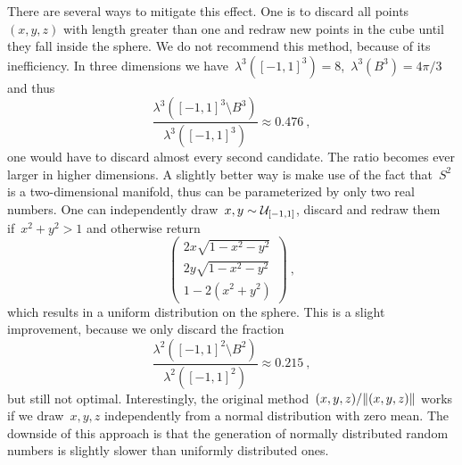 There are several ways to mitigate this effect. One is to discard all
points~$(x,y,z)$ with length greater than one and redraw new points in the cube
until they fall inside the sphere. We do not recommend this method, because of
its inefficiency. In three dimensions we have~$\lambda^3([-1,1]^3) =
8$,~$\lambda^3(B^3) = 4 \pi / 3$ and thus
%
\begin{equation}
  \frac{\lambda^3([-1,1]^3 \setminus B^3)}{\lambda^3([-1,1]^3)} \approx 0.476\:,
\end{equation}
%
\ie{} one would have to discard almost every second candidate. The ratio becomes
ever larger in higher dimensions. A slightly better way is make use of the fact
that~$S^2$ is a two-dimensional manifold, thus can be parameterized by only two
real numbers. One can independently draw~$x,y \sim \mathcal{U}_{[-1,1]}$, discard and
redraw them if~$x^2 + y^2 > 1$ and otherwise return
%
\begin{equation}
  \begin{pmatrix}
    2 x \sqrt{1 - x^2 - y^2} \\
    2 y \sqrt{1 - x^2 - y^2} \\
    1 - 2 (x^2 + y^2)
  \end{pmatrix} \:,
\end{equation}
%
which results in a uniform distribution on the sphere. This is a slight
improvement, because we only discard the fraction
%
\begin{equation}
  \frac{\lambda^2([-1,1]^2 \setminus B^2)}{\lambda^2([-1,1]^2)} \approx 0.215\:,
\end{equation}
%
but still not optimal. Interestingly, the original
method~$(x,y,z)/\norm{(x,y,z)}$ works if we draw~$x,y,z$ independently from a
normal distribution with zero mean. The downside of this approach is that the
generation of normally distributed random numbers is slightly slower than
uniformly distributed ones.

